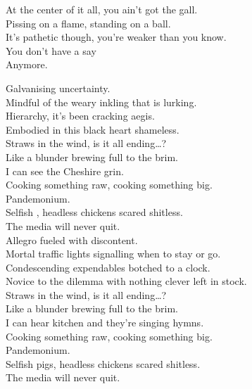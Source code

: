 At the center of it all, you ain't got the gall. \\
Pissing on a flame, standing on a ball. \\
It's pathetic though, you're weaker than you know. \\
You don't have a say \\
Anymore. \\





Galvanising uncertainty. \\
Mindful of the weary inkling that is lurking. \\
Hierarchy, it's been cracking aegis. \\
Embodied in this black heart shameless. \\

Straws in the wind, is it all ending…? \\

Like a blunder brewing full to the brim. \\
I can see the  Cheshire grin. \\

Cooking something raw, cooking something big. \\
Pandemonium. \\
Selfish , headless chickens scared shitless. \\
The media will never quit. \\

Allegro fueled with discontent. \\
Mortal traffic lights signalling when to stay or go. \\
Condescending expendables botched to a clock. \\
Novice to the dilemma with nothing clever left in stock. \\

Straws in the wind, is it all ending…? \\

Like a blunder brewing full to the brim. \\
I can hear  kitchen and they're singing hymns. \\

Cooking something raw, cooking something big. \\
Pandemonium. \\
Selfish pigs, headless chickens scared shitless. \\
The media will never quit. \\

